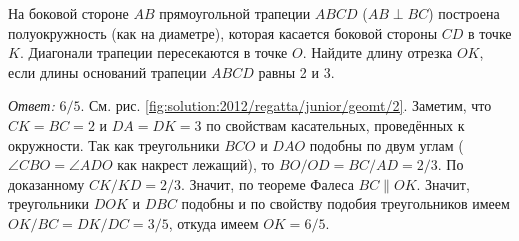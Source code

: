 На боковой стороне $AB$ прямоугольной трапеции $ABCD$ ($AB \perp BC$)
построена полуокружность (как на диаметре), которая касается боковой стороны
$CD$ в точке $K$.
Диагонали трапеции пересекаются в точке $O$.
Найдите длину отрезка $OK$, если длины оснований трапеции $ABCD$ равны 2 и 3.

%
\label{solution:2012/regatta/junior/geomt/2}%
\emph{Ответ:} $6 / 5$.
См. рис. \ref{fig:solution:2012/regatta/junior/geomt/2}.
Заметим, что $CK = BC = 2$ и $DA = DK = 3$ по свойствам касательных,
проведённых к окружности.
Так как треугольники $BCO$ и $DAO$ подобны по двум углам
($\angle CBO = \angle ADO$ как накрест лежащий),
то $BO / OD = BC / AD = 2 / 3$.
По доказанному $CK / KD = 2 / 3$.
Значит, по теореме Фалеса $BC \parallel OK$.
Значит, треугольники $DOK$ и $DBC$ подобны и по свойству подобия треугольников
имеем $OK / BC = DK / DC = 3 / 5$, откуда имеем $OK = 6 / 5$.

